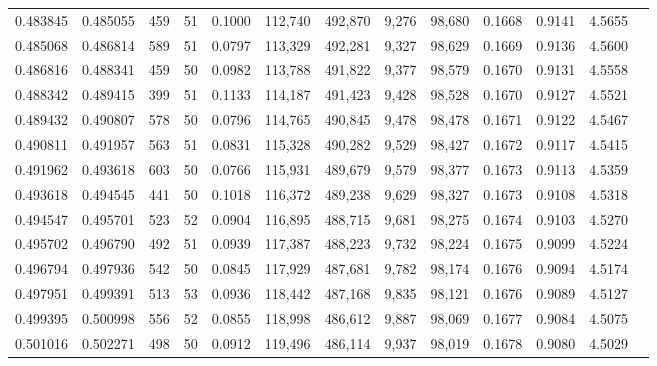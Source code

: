 \begin{tabular}{rrrrrrrrrrrrr}
0.483845 & 0.485055 &   459 &  51 &                                     0.1000 & 112,740 & 492,870 &   9,276 &  98,680 & 0.1668 & 0.9141 & 4.5655 \\
0.485068 & 0.486814 &   589 &  51 &                                     0.0797 & 113,329 & 492,281 &   9,327 &  98,629 & 0.1669 & 0.9136 & 4.5600 \\
0.486816 & 0.488341 &   459 &  50 &                                     0.0982 & 113,788 & 491,822 &   9,377 &  98,579 & 0.1670 & 0.9131 & 4.5558 \\
0.488342 & 0.489415 &   399 &  51 &                                     0.1133 & 114,187 & 491,423 &   9,428 &  98,528 & 0.1670 & 0.9127 & 4.5521 \\
0.489432 & 0.490807 &   578 &  50 &                                     0.0796 & 114,765 & 490,845 &   9,478 &  98,478 & 0.1671 & 0.9122 & 4.5467 \\
0.490811 & 0.491957 &   563 &  51 &                                     0.0831 & 115,328 & 490,282 &   9,529 &  98,427 & 0.1672 & 0.9117 & 4.5415 \\
0.491962 & 0.493618 &   603 &  50 &                                     0.0766 & 115,931 & 489,679 &   9,579 &  98,377 & 0.1673 & 0.9113 & 4.5359 \\
0.493618 & 0.494545 &   441 &  50 &                                     0.1018 & 116,372 & 489,238 &   9,629 &  98,327 & 0.1673 & 0.9108 & 4.5318 \\
0.494547 & 0.495701 &   523 &  52 &                                     0.0904 & 116,895 & 488,715 &   9,681 &  98,275 & 0.1674 & 0.9103 & 4.5270 \\
0.495702 & 0.496790 &   492 &  51 &                                     0.0939 & 117,387 & 488,223 &   9,732 &  98,224 & 0.1675 & 0.9099 & 4.5224 \\
0.496794 & 0.497936 &   542 &  50 &                                     0.0845 & 117,929 & 487,681 &   9,782 &  98,174 & 0.1676 & 0.9094 & 4.5174 \\
0.497951 & 0.499391 &   513 &  53 &                                     0.0936 & 118,442 & 487,168 &   9,835 &  98,121 & 0.1676 & 0.9089 & 4.5127 \\
0.499395 & 0.500998 &   556 &  52 &                                     0.0855 & 118,998 & 486,612 &   9,887 &  98,069 & 0.1677 & 0.9084 & 4.5075 \\
0.501016 & 0.502271 &   498 &  50 &                                     0.0912 & 119,496 & 486,114 &   9,937 &  98,019 & 0.1678 & 0.9080 & 4.5029 \\

\end{tabular}
